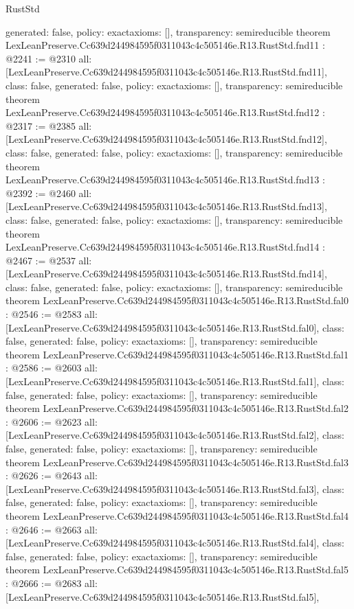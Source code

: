 \begin{lexlean}{RustStd}
\begin{coremodule}
{  generated: false,
  policy: exact{axioms: []},
  transparency: semireducible
}
theorem LexLeanPreserve.Cc639d244984595f0311043c4c505146e.R13.RustStd.fnd11 : @2241 := @2310 {
  all: [LexLeanPreserve.Cc639d244984595f0311043c4c505146e.R13.RustStd.fnd11],
  class: false,
  generated: false,
  policy: exact{axioms: []},
  transparency: semireducible
}
theorem LexLeanPreserve.Cc639d244984595f0311043c4c505146e.R13.RustStd.fnd12 : @2317 := @2385 {
  all: [LexLeanPreserve.Cc639d244984595f0311043c4c505146e.R13.RustStd.fnd12],
  class: false,
  generated: false,
  policy: exact{axioms: []},
  transparency: semireducible
}
theorem LexLeanPreserve.Cc639d244984595f0311043c4c505146e.R13.RustStd.fnd13 : @2392 := @2460 {
  all: [LexLeanPreserve.Cc639d244984595f0311043c4c505146e.R13.RustStd.fnd13],
  class: false,
  generated: false,
  policy: exact{axioms: []},
  transparency: semireducible
}
theorem LexLeanPreserve.Cc639d244984595f0311043c4c505146e.R13.RustStd.fnd14 : @2467 := @2537 {
  all: [LexLeanPreserve.Cc639d244984595f0311043c4c505146e.R13.RustStd.fnd14],
  class: false,
  generated: false,
  policy: exact{axioms: []},
  transparency: semireducible
}
theorem LexLeanPreserve.Cc639d244984595f0311043c4c505146e.R13.RustStd.fal0 : @2546 := @2583 {
  all: [LexLeanPreserve.Cc639d244984595f0311043c4c505146e.R13.RustStd.fal0],
  class: false,
  generated: false,
  policy: exact{axioms: []},
  transparency: semireducible
}
theorem LexLeanPreserve.Cc639d244984595f0311043c4c505146e.R13.RustStd.fal1 : @2586 := @2603 {
  all: [LexLeanPreserve.Cc639d244984595f0311043c4c505146e.R13.RustStd.fal1],
  class: false,
  generated: false,
  policy: exact{axioms: []},
  transparency: semireducible
}
theorem LexLeanPreserve.Cc639d244984595f0311043c4c505146e.R13.RustStd.fal2 : @2606 := @2623 {
  all: [LexLeanPreserve.Cc639d244984595f0311043c4c505146e.R13.RustStd.fal2],
  class: false,
  generated: false,
  policy: exact{axioms: []},
  transparency: semireducible
}
theorem LexLeanPreserve.Cc639d244984595f0311043c4c505146e.R13.RustStd.fal3 : @2626 := @2643 {
  all: [LexLeanPreserve.Cc639d244984595f0311043c4c505146e.R13.RustStd.fal3],
  class: false,
  generated: false,
  policy: exact{axioms: []},
  transparency: semireducible
}
theorem LexLeanPreserve.Cc639d244984595f0311043c4c505146e.R13.RustStd.fal4 : @2646 := @2663 {
  all: [LexLeanPreserve.Cc639d244984595f0311043c4c505146e.R13.RustStd.fal4],
  class: false,
  generated: false,
  policy: exact{axioms: []},
  transparency: semireducible
}
theorem LexLeanPreserve.Cc639d244984595f0311043c4c505146e.R13.RustStd.fal5 : @2666 := @2683 {
  all: [LexLeanPreserve.Cc639d244984595f0311043c4c505146e.R13.RustStd.fal5],
}
\end{coremodule}
\end{lexlean}
